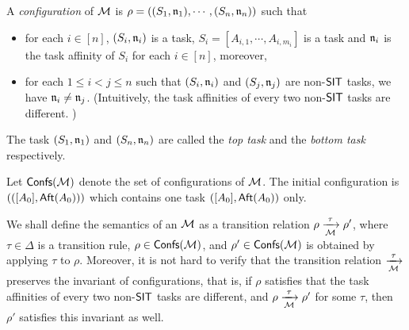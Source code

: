 A \emph{configuration} of ${\mathcal{M} }$ is $\rho = ((S_1,\mathfrak{n}_1), \cdots, (S_n,\mathfrak{n}_n))$ such that
\begin{itemize}
\item for each $i \in [n]$, $(S_i,\mathfrak{n}_i)$ is a task, $S_i = [A_{i,1}, \cdots, A_{i, m_i}]$ is a task and $\mathfrak{n}_i$ is the task affinity of $S_i$ for each $i \in [n]$, moreover, 
%
\item for each $1 \le i < j \le n$ such that $(S_i, \mathfrak{n}_i)$ and $(S_j, \mathfrak{n}_j)$ are non-$\mathsf{SIT}$ tasks,  we have $ \mathfrak{n}_i \neq \mathfrak{n}_j$.  (Intuitively, the task affinities of every two non-$\mathsf{SIT}$ tasks are different. )
\end{itemize}
The task $(S_1,\mathfrak{n}_1)$ and $(S_n,\mathfrak{n}_n)$ are called the \emph{top task} and the \emph{bottom task} respectively. 


Let ${\mathsf{Confs} }({\mathcal{M} })$ denote the set of configurations of ${\mathcal{M} }$.
The initial configuration is $(([A_0],{\sf Aft}(A_0)))$ which contains one task $([A_0], {\sf Aft}(A_0))$ only. 

We shall define the semantics of an {\AMASS} ${\mathcal{M} }$ as a transition relation $\rho \xrightarrow[{\mathcal{M} }]{\tau} \rho'$, where $\tau \in \Delta$ is a transition rule, $\rho \in {\mathsf{Confs} }({\mathcal{M} })$, and $\rho' \in {\mathsf{Confs} }({\mathcal{M} })$ is obtained by applying $\tau$ to $\rho$. Moreover, it is not hard to verify that the transition relation $\xrightarrow[{\mathcal{M} }]{\tau}$ preserves the invariant of configurations, that is, if $\rho$ satisfies that the task affinities of every two non-${\sf SIT}$ tasks are different, and $\rho \xrightarrow[{\mathcal{M} }]{\tau} \rho'$ for some $\tau$, then $\rho'$ satisfies this invariant as well. 

